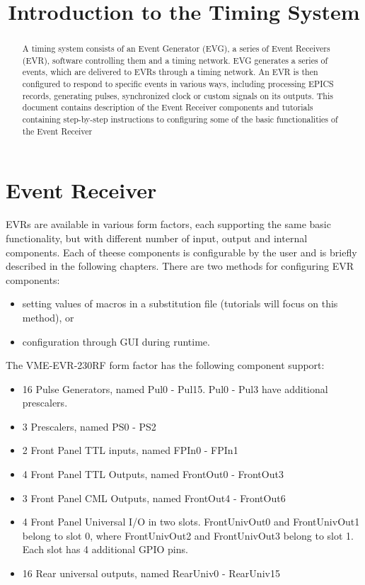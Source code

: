 \documentclass[12pt,a4paper]{article}
\title{Introduction to the Timing System}
\begin{document}
\maketitle

\begin{abstract}
A timing system consists of an Event Generator (EVG), a series of Event Receivers (EVR), software controlling them and a timing network. EVG generates a series of events, which are delivered to EVRs through a timing network. An EVR is then configured to respond to specific events in various ways, including processing EPICS records, generating pulses, synchronized clock or custom signals on its outputs.
This document contains description of the Event Receiver components and tutorials containing step-by-step instructions to configuring some of the basic functionalities of the Event Receiver
\end{abstract}

\tableofcontents

\section{Event Receiver}
EVRs are available in various form factors, each supporting the same basic functionality, but with different number of input, output and internal components. Each of theese components is configurable by the user and is briefly described in the following chapters. There are two methods for configuring EVR components:
\begin{itemize}
  \item setting values of macros in a substitution file (tutorials will focus on this method), or
  \item configuration through GUI during runtime.
\end{itemize}
The VME-EVR-230RF form factor has the following component support:
\begin{itemize}
  \item 16 Pulse Generators, named Pul0 - Pul15. Pul0 - Pul3 have additional prescalers.
  \item 3 Prescalers, named PS0 - PS2
  \item 2 Front Panel TTL inputs, named FPIn0 - FPIn1
  \item 4 Front Panel TTL Outputs, named FrontOut0 - FrontOut3
  \item 3 Front Panel CML Outputs, named FrontOut4 - FrontOut6
  \item 4 Front Panel Universal I/O in two slots. FrontUnivOut0 and FrontUnivOut1 belong to slot 0, where FrontUnivOut2 and FrontUnivOut3 belong to slot 1. Each slot has 4 additional GPIO pins.
  \item 16 Rear universal outputs, named RearUniv0 - RearUniv15
\end{itemize}
\end{document}
